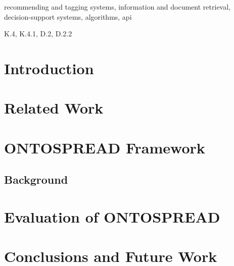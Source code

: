 \documentclass{article}[10pt]
\begin{document}
\begin{keywords}
recommending and tagging systems, information and document retrieval, decision-support systems, algorithms, api
\end{keywords}

\begin{category}
K.4, K.4.1, D.2, D.2.2
\end{category}

\section{Introduction}

\section{Related Work}\label{related-work}

\section{ONTOSPREAD Framework}
\subsection{Background}\label{background}


\section{Evaluation of ONTOSPREAD}
%
\section{Conclusions and Future Work}


% 
% 
% 
% 
% 
% 





\end{document}
